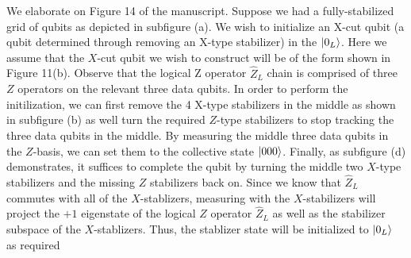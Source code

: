 \documentclass[12pt]{article}%
\begin{document}
We elaborate on Figure 14 of the manuscript. Suppose we had a fully-stabilized grid of qubits as depicted in subfigure (a). We wish to initialize an X-cut qubit (a qubit determined through removing an X-type stabilizer) in the $\ket{0_L}$. Here we assume that the $X$-cut qubit we wish to construct will be of the form shown in Figure 11(b). Observe that the logical Z operator $\hat{Z}_L$ chain is comprised of three $Z$ operators on the relevant three data qubits. In order to perform the initilization, we can first remove the 4 X-type stabilizers in the middle as shown in subfigure (b) as well turn the required $Z$-type stabilizers to stop tracking the three data qubits in the middle. By measuring the middle three data qubits in the $Z$-basis, we can set them to the collective state $\ket{000}$. Finally, as subfigure (d) demonstrates, it suffices to complete the qubit by turning the middle two $X$-type stabilizers and the missing $Z$ stabilizers back on. Since we know that $\hat{Z}_L$ commutes with all of the $X$-stablizers, measuring with the $X$-stabilizers will project the $+1$ eigenstate of the logical $Z$ operator $\hat{Z}_L$ as well as the stabilizer subspace of the $X$-stablizers. Thus, the stablizer state will be initialized to $\ket{0_L}$ as required \newline
\end{document}
